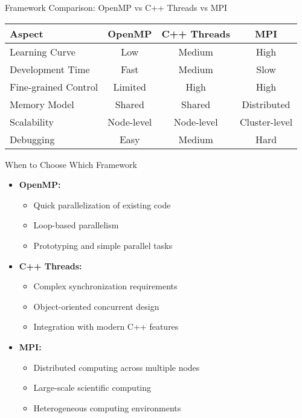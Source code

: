 \begin{frame}{Framework Comparison: OpenMP vs C++ Threads vs MPI}
	\begin{table}[h]
		\centering
		\footnotesize
		\begin{tabular}{|l|c|c|c|}
			\hline
			\textbf{Aspect}      & \textbf{OpenMP} & \textbf{C++ Threads} & \textbf{MPI}  \\
			\hline
			Learning Curve       & Low             & Medium               & High          \\
			\hline
			Development Time     & Fast            & Medium               & Slow          \\
			\hline
			Fine-grained Control & Limited         & High                 & High          \\
			\hline
			Memory Model         & Shared          & Shared               & Distributed   \\
			\hline
			Scalability          & Node-level      & Node-level           & Cluster-level \\
			\hline
			Debugging            & Easy            & Medium               & Hard          \\
			\hline
		\end{tabular}
	\end{table}
\end{frame}

\begin{frame}{When to Choose Which Framework}
	\begin{itemize}
		\item \textbf{OpenMP:}
		      \begin{itemize}
			      \item Quick parallelization of existing code
			      \item Loop-based parallelism
			      \item Prototyping and simple parallel tasks
		      \end{itemize}
		\item \textbf{C++ Threads:}
		      \begin{itemize}
			      \item Complex synchronization requirements
			      \item Object-oriented concurrent design
			      \item Integration with modern C++ features
		      \end{itemize}
		\item \textbf{MPI:}
		      \begin{itemize}
			      \item Distributed computing across multiple nodes
			      \item Large-scale scientific computing
			      \item Heterogeneous computing environments
		      \end{itemize}
	\end{itemize}
\end{frame}

